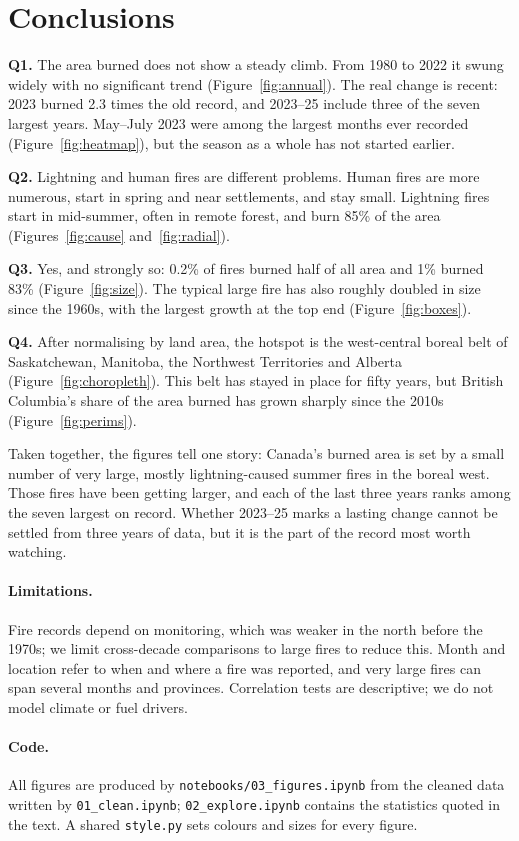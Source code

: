 \documentclass[12pt]{article}
\begin{document}
\section{Conclusions}

\textbf{Q1.} The area burned does not show a steady climb. From 1980 to 2022 it swung
widely with no significant trend (Figure~\ref{fig:annual}). The real change is recent:
2023 burned 2.3 times the old record, and 2023--25 include three of the seven largest
years. May--July 2023 were among the largest months ever recorded (Figure~\ref{fig:heatmap}),
but the season as a whole has not started earlier.

\textbf{Q2.} Lightning and human fires are different problems. Human fires are more
numerous, start in spring and near settlements, and stay small. Lightning fires start in
mid-summer, often in remote forest, and burn 85\% of the area
(Figures~\ref{fig:cause} and~\ref{fig:radial}).

\textbf{Q3.} Yes, and strongly so: 0.2\% of fires burned half of all area and 1\% burned
83\% (Figure~\ref{fig:size}). The typical large fire has also roughly doubled in size since
the 1960s, with the largest growth at the top end (Figure~\ref{fig:boxes}).

\textbf{Q4.} After normalising by land area, the hotspot is the west-central boreal belt of
Saskatchewan, Manitoba, the Northwest Territories and Alberta (Figure~\ref{fig:choropleth}).
This belt has stayed in place for fifty years, but British Columbia's share of the area
burned has grown sharply since the 2010s (Figure~\ref{fig:perims}).

Taken together, the figures tell one story: Canada's burned area is set by a small number
of very large, mostly lightning-caused summer fires in the boreal west. Those fires have
been getting larger, and each of the last three years ranks among the seven largest on record. Whether 2023--25 marks
a lasting change cannot be settled from three years of data, but it is the part of the
record most worth watching.

\paragraph{Limitations.} Fire records depend on monitoring, which was weaker in the north
before the 1970s; we limit cross-decade comparisons to large fires to reduce this. Month
and location refer to when and where a fire was reported, and very large fires can span
several months and provinces. Correlation tests are descriptive; we do not model climate
or fuel drivers.

\paragraph{Code.} All figures are produced by \texttt{notebooks/03\_figures.ipynb} from the
cleaned data written by \texttt{01\_clean.ipynb}; \texttt{02\_explore.ipynb} contains the
statistics quoted in the text. A shared \texttt{style.py} sets colours and sizes for every
figure.



\end{document}
